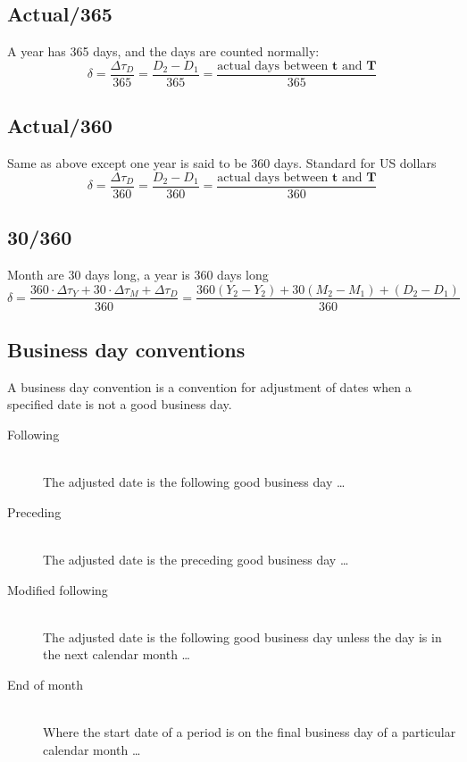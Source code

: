 \documentclass[11pt,a4paper]{article}
\numberwithin{equation}{section}
\begin{document}
\subsection{Actual/365}
A year has 365 days, and the days are counted normally:
\[
\delta = \frac{\Delta \tau_D}{365} = \frac{D_2-D_1}{365} = \frac{\text{actual days between } \boldsymbol{t} \text{ and } \boldsymbol{T}}{365}
\]
\subsection{Actual/360}
Same as above except one year is said to be 360 days. Standard for US dollars
\[
\delta = \frac{\Delta \tau_D}{360} =\frac{D_2-D_1}{360} = \frac{\text{actual days between } \boldsymbol{t} \text{ and } \boldsymbol{T}}{360}
\]
\subsection{30/360}
Month are 30 days long, a year is 360 days long
\[
\delta = \frac{360 \cdot \Delta \tau_Y + 30 \cdot \Delta \tau_M + \Delta \tau_D}{360} =\frac{360(Y_2-Y_2)+30(M_2-M_1)+(D_2-D_1)}{360}
\]

\subsection{Business day conventions}
A business day convention is a convention for adjustment of dates when a specified date is not a good business day. 
\begin{description}
  \item[Following] \hfill \\
The adjusted date is the following good business day \ldots
  \item[Preceding] \hfill \\
    The adjusted date is the preceding good business day \ldots
  \item[Modified following] \hfill \\
  The adjusted date is the following good business day unless the day is in the next calendar month \ldots
  \item[End of month] \hfill \\
Where the start date of a period is on the final business day of a particular calendar month \ldots
\end{description}

\newpage



\end{document}
